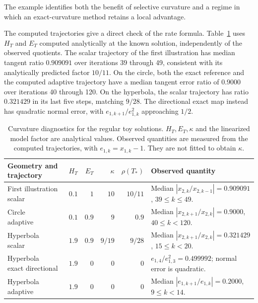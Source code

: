 \documentclass[pdflatex,sn-mathphys-num]{sn-jnl}
\theoremstyle{thmstyleone}
\theoremstyle{thmstylethree}
\begin{document}
The example identifies both the benefit of selective curvature and a
regime in which an exact-curvature method retains a local advantage.

The computed trajectories give a direct check of the rate
formula. Table~\ref{tab:toy-curvature-rates} uses $H_T$ and $E_T$
computed analytically at the known solution, independently of the
observed quotients. The scalar trajectory of the first illustration has
median tangent ratio $0.909091$ over iterations 39 through 49, consistent
with its analytically predicted factor $10/11$. On the circle, both the exact reference and the
computed adaptive trajectory have a median tangent error ratio of
$0.9000$ over iterations 40 through 120. On the hyperbola, the scalar
trajectory has ratio $0.321429$ in its last five steps, matching $9/28$.
The directional exact map instead has quadratic normal error, with
$e_{1,k+1}/e_{1,k}^2$ approaching $1/2$.

\begin{table}[tb]
\centering\small
\caption{Curvature diagnostics for the regular toy solutions.
$H_T,E_T,\kappa$ and the linearized model factor are analytical values.
Observed quantities are measured from the computed trajectories, with
$e_{1,k}=x_{1,k}-1$. They are not fitted to obtain $\kappa$.}
\label{tab:toy-curvature-rates}
\begin{tabularx}{\linewidth}{@{}lrrrr>{\raggedright\arraybackslash}X@{}}
\toprule
Geometry and trajectory & $H_T$ & $E_T$ & $\kappa$ & $\rho(T_*)$ & Observed quantity\\
\midrule
\shortstack[l]{First illustration\\scalar} & $0.1$ & $1$ & $10$ & $10/11$
 & Median $|x_{2,k}/x_{2,k-1}|=0.909091$, $39\leq k\leq49$.\\
\shortstack[l]{Circle\\adaptive} & $0.1$ & $0.9$ & $9$ & $0.9$
 & Median $|x_{2,k+1}/x_{2,k}|=0.9000$, $40\leq k<120$.\\
\shortstack[l]{Hyperbola\\scalar} & $1.9$ & $0.9$ & $9/19$ & $9/28$
 & Median $|x_{2,k+1}/x_{2,k}|=0.321429$, $15\leq k<20$.\\
\shortstack[l]{Hyperbola\\exact directional} & $1.9$ & $0$ & $0$ & $0$
 & $e_{1,4}/e_{1,3}^2=0.499992$; normal error is quadratic.\\
\shortstack[l]{Hyperbola\\adaptive} & $1.9$ & $0$ & $0$ & $0$
 & Median $|e_{1,k+1}/e_{1,k}|=0.2000$, $9\leq k<14$.\\
\bottomrule
\end{tabularx}
\end{table}
\end{document}
